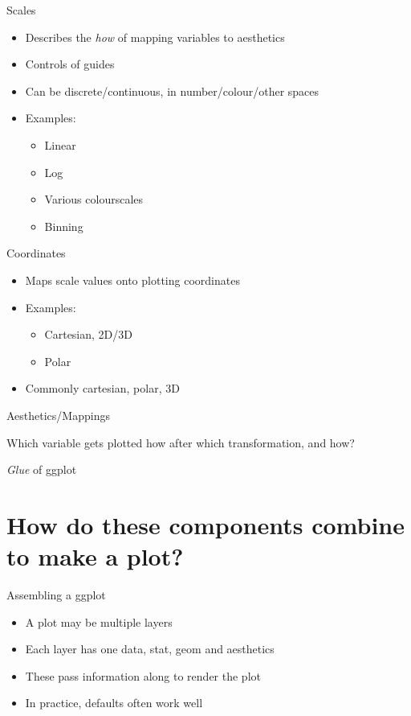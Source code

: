 \documentclass[11pt]{beamer}
\begin{document}
\begin{frame}{Scales}
	\begin{itemize}
		\item Describes the \emph{how} of mapping variables to aesthetics
		\item Controls of guides
		\item Can be discrete/continuous, in number/colour/other spaces
			\pause
		\item Examples:
			\pause
			\begin{itemize}
				\item Linear
				\item Log
				\item Various colourscales
				\item Binning
			\end{itemize}
	\end{itemize}
\end{frame}

\begin{frame}{Coordinates}
	\begin{itemize}
		\item Maps scale values onto plotting coordinates
		\item Examples:
			\pause
			\begin{itemize}
				\item Cartesian, 2D/3D
				\item Polar
			\end{itemize}
		\item Commonly cartesian, polar, 3D
	\end{itemize}
\end{frame}

\begin{frame}{Aesthetics/Mappings}
	\begin{itemize}
		{\bf \item Which variable gets plotted how after which transformation, and how?}
		\item \emph{Glue} of ggplot
	\end{itemize}
\end{frame}

\section*{How do these components combine to make a plot?}

\begin{frame}{Assembling a ggplot}
	\begin{itemize}
		\item A plot may be multiple layers
		\item Each layer has one data, stat, geom and aesthetics
		\item These pass information along to render the plot
			\pause
		\item In practice, defaults often work well
	\end{itemize}
\end{frame}
\end{document}
